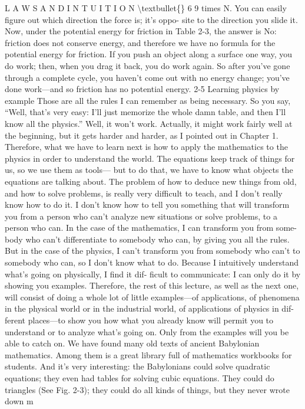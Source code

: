 \documentclass[10pt,oneside]{article}
\begin{document}
L A W S  A N D  I N T U I T I O N \textbackslash{}textbullet\{\} 6 9 times N. You can easily figure out which direction the force is; it’s oppo- site to the direction you slide it. Now, under the potential energy for friction in Table 2-3, the answer is No: friction does not conserve energy, and therefore we have no formula for the potential energy for friction. If you push an object along a surface one way, you do work; then, when you drag it back, you do work again. So after you’ve gone through a complete cycle, you haven’t come out with no energy change; you’ve done work---and so friction has no potential energy. 2-5 Learning physics by example Those are all the rules I can remember as being necessary. So you say, “Well, that’s very easy: I’ll just memorize the whole damn table, and then I’ll know all the physics.” Well, it won’t work. Actually, it might work fairly well at the beginning, but it gets harder and harder, as I pointed out in Chapter 1. Therefore, what we have to learn next is how to apply the mathematics to the physics in order to understand the world. The equations keep track of things for us, so we use them as tools--- but to do that, we have to know what objects the equations are talking about. The problem of how to deduce new things from old, and how to solve problems, is really very difficult to teach, and I don’t really know how to do it. I don’t know how to tell you something that will transform you from a person who can’t analyze new situations or solve problems, to a person who can. In the case of the mathematics, I can transform you from some- body who can’t differentiate to somebody who can, by giving you all the rules. But in the case of the physics, I can’t transform you from somebody who can’t to somebody who can, so I don’t know what to do. Because I intuitively understand what’s going on physically, I find it dif- ficult to communicate: I can only do it by showing you examples. Therefore, the rest of this lecture, as well as the next one, will consist of doing a whole lot of little examples---of applications, of phenomena in the physical world or in the industrial world, of applications of physics in dif- ferent places---to show you how what you already know will permit you to understand or to analyze what’s going on. Only from the examples will you be able to catch on. We have found many old texts of ancient Babylonian mathematics. Among them is a great library full of mathematics workbooks for students. And it’s very interesting: the Babylonians could solve quadratic equations; they even had tables for solving cubic equations. They could do triangles (See Fig. 2-3); they could do all kinds of things, but they never wrote down m\par
\end{document}
